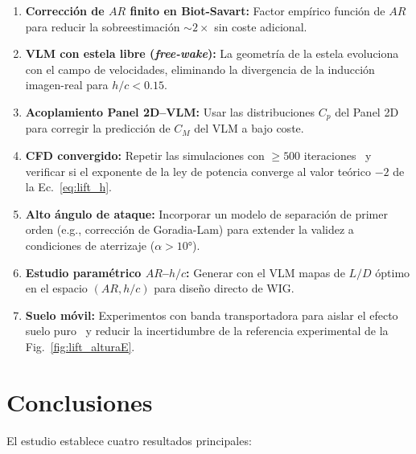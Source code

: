 \documentclass[twocolumn]{article}
\begin{document}
\begin{enumerate}
    \item \textbf{Corrección de $AR$ finito en Biot-Savart:} Factor empírico función de $AR$ para reducir la sobreestimación $\sim 2\times$ sin coste adicional.
    \item \textbf{VLM con estela libre (\textit{free-wake}):} La geometría de la estela evoluciona con el campo de velocidades, eliminando la divergencia de la inducción imagen-real para $h/c < 0.15$.
    \item \textbf{Acoplamiento Panel 2D--VLM:} Usar las distribuciones $C_p$ del Panel 2D para corregir la predicción de $C_M$ del VLM a bajo coste.
    \item \textbf{CFD convergido:} Repetir las simulaciones con $\geq 500$ iteraciones~\cite{versteeg2007} y verificar si el exponente de la ley de potencia converge al valor teórico $-2$ de la Ec.~\eqref{eq:lift_h}.
    \item \textbf{Alto ángulo de ataque:} Incorporar un modelo de separación de primer orden (e.g., corrección de Goradia-Lam) para extender la validez a condiciones de aterrizaje ($\alpha > 10°$).
    \item \textbf{Estudio paramétrico $AR$--$h/c$:} Generar con el VLM mapas de $L/D$ óptimo en el espacio $(AR, h/c)$ para diseño directo de WIG.
    \item \textbf{Suelo móvil:} Experimentos con banda transportadora para aislar el efecto suelo puro~\cite{zerihan2000} y reducir la incertidumbre de la referencia experimental de la Fig.~\ref{fig:lift_alturaE}.
\end{enumerate}

\section{Conclusiones}

El estudio establece cuatro resultados principales:
\end{document}
